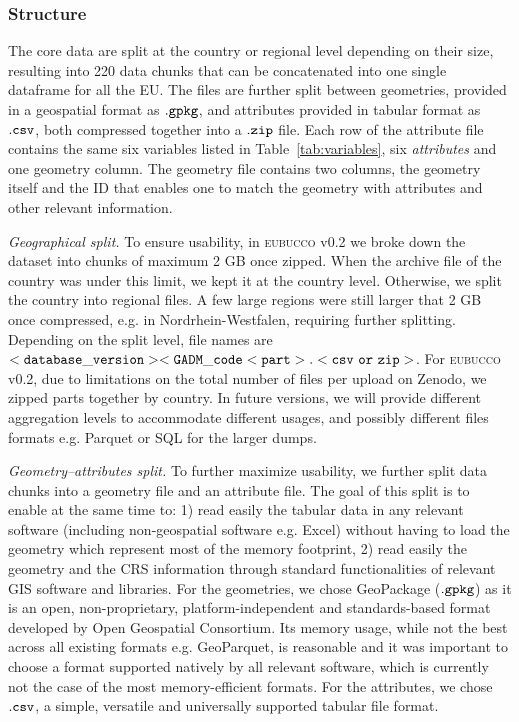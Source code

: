\documentclass[fleqn,10pt]{wlscirep}
\begin{document}
\subsubsection*{Structure}

The core data are split at the country or regional level depending on their size, resulting into 220 data chunks that can be concatenated into one single dataframe for all the EU. The files are further split between geometries, provided in a geospatial format as $\tt{.gpkg}$, and attributes provided in tabular format as $\tt{.csv}$, both compressed together into a $\tt{.zip}$ file. Each row of the attribute file contains the same six variables listed in Table~\ref{tab:variables}, six \textit{attributes} and one geometry column. The geometry file contains two columns, the geometry itself and the ID that enables one to match the geometry with attributes and other relevant information. 

\textit{Geographical split.} To ensure usability, in \textsc{eubucco} v0.2 we broke down the dataset into chunks of maximum 2 GB once zipped. When the archive file of the country was under this limit, we kept it at the country level. Otherwise, we split the country into regional files. A few large regions were still larger that 2 GB once compressed, e.g. in Nordrhein-Westfalen, requiring further splitting. Depending on the split level, file names are ${\tt <database\_version>\-<GADM\_code\-<part>.<csv\ or\ zip>}$. For \textsc{eubucco} v0.2, due to limitations on the total number of files per upload on Zenodo, we zipped parts together by country. In future versions, we will provide different aggregation levels to accommodate different usages, and possibly different files formats e.g. Parquet or SQL for the larger dumps.

\textit{Geometry--attributes split.}
To further maximize usability, we further split data chunks into a geometry file and an attribute file. The goal of this split is to enable at the same time to: 1) read easily the tabular data in any relevant software (including non-geospatial software e.g. Excel) without having to load the geometry which represent most of the memory footprint, 2) read easily the geometry and the CRS information through standard functionalities of relevant GIS software and libraries. For the geometries, we chose GeoPackage ($\tt{.gpkg}$) as it is an open, non-proprietary, platform-independent and standards-based format developed by Open Geospatial Consortium. Its memory usage, while not the best across all existing formats e.g. GeoParquet, is reasonable and it was important to choose a format supported natively by all relevant software, which is currently not the case of the most memory-efficient formats. For the attributes, we chose $\tt{.csv}$, a simple, versatile and universally supported tabular file format. 
\end{document}

